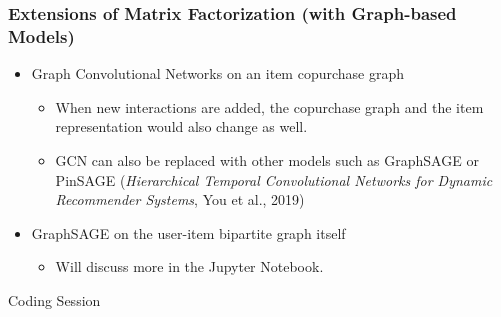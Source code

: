 \documentclass[11pt]{beamer}
\begin{document}
	\begin{frame}
		\frametitle{Extensions of Matrix Factorization \tiny (with Graph-based Models)}
		\begin{itemize}
			\item Graph Convolutional Networks on an item copurchase graph
			\begin{itemize}
				\item When new interactions are added, the copurchase graph and the item representation would also change as well.
				\item GCN can also be replaced with other models such as GraphSAGE or PinSAGE (\textit{Hierarchical Temporal Convolutional Networks for Dynamic Recommender Systems}, You et al., 2019)
			\end{itemize}
			\item GraphSAGE on the user-item bipartite graph itself
			\begin{itemize}
				\item Will discuss more in the Jupyter Notebook.
			\end{itemize}
		\end{itemize}
	\end{frame}

	\begin{frame}
		\begin{center}
			\centering
			\Huge Coding Session
		\end{center}
	\end{frame}
\end{document}

